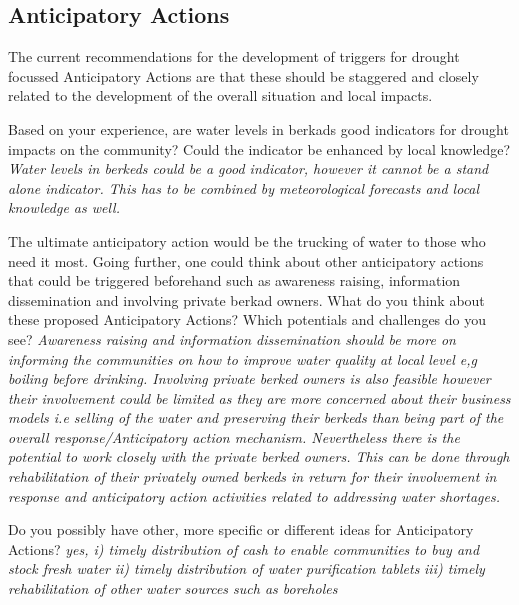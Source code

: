 \subsection*{Anticipatory Actions}
The current recommendations for the development of triggers for drought focussed Anticipatory Actions are that these should be staggered and closely related to the development of the overall situation and local impacts.

Based on your experience, are water levels in berkads good indicators for drought impacts on the community? Could the indicator be enhanced by local knowledge?\newline
\textit{Water levels in berkeds could be a good indicator, however it cannot be a stand alone indicator. This has to be combined by meteorological forecasts and local knowledge as well.}

The ultimate anticipatory action would be the trucking of water to those who need it most. Going further, one could think about other anticipatory actions that could be triggered beforehand such as awareness raising, information dissemination and involving private berkad owners. What do you think about these proposed Anticipatory Actions? Which potentials and challenges do you see? \newline
\textit{Awareness raising and information dissemination should be more on informing the communities on how to improve water quality at local level e,g boiling before drinking. Involving private berked owners is also feasible however their involvement could be limited as they are more concerned about their business models i.e selling of the water and preserving their berkeds than being part of the overall response/Anticipatory action mechanism. Nevertheless there is the potential to work closely with the private berked owners. This can be done through rehabilitation of their privately owned berkeds in return for their involvement in response and anticipatory action activities related to addressing water shortages.}

Do you possibly have other, more specific or different ideas for Anticipatory Actions? \newline
\textit{yes, i) timely distribution of cash to enable communities to buy and stock fresh water}\newline
\textit{ii) timely distribution of water purification tablets}\newline
\textit{iii) timely rehabilitation of other water sources such as boreholes}\newline

